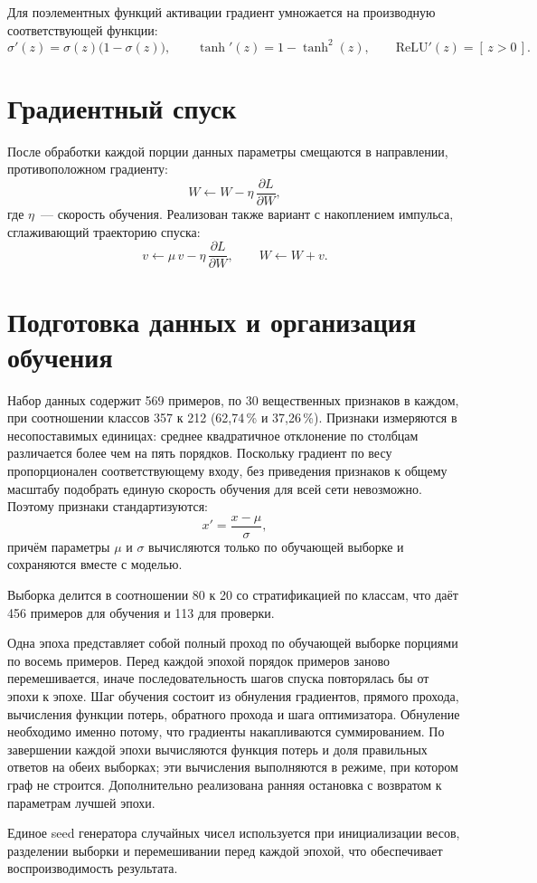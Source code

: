 Для поэлементных функций активации градиент умножается на производную соответствующей
функции:
\begin{equation}
    \sigma'(z) = \sigma(z)\bigl(1 - \sigma(z)\bigr), \qquad
    \tanh'(z) = 1 - \tanh^2(z), \qquad
    \mathrm{ReLU}'(z) = [\,z > 0\,].
    \label{eq:activation-grad}
\end{equation}

\section{Градиентный спуск}

После обработки каждой порции данных параметры смещаются в направлении, противоположном
градиенту:
\begin{equation}
    W \leftarrow W - \eta\,\frac{\partial L}{\partial W},
    \label{eq:sgd}
\end{equation}
где $\eta$~--- скорость обучения. Реализован также вариант с накоплением импульса,
сглаживающий траекторию спуска:
\begin{equation}
    v \leftarrow \mu\,v - \eta\,\frac{\partial L}{\partial W},
    \qquad
    W \leftarrow W + v.
    \label{eq:momentum}
\end{equation}

\section{Подготовка данных и организация обучения}

Набор данных содержит 569 примеров, по 30 вещественных признаков в каждом, при
соотношении классов 357 к 212 (62,74\,\% и 37,26\,\%). Признаки измеряются в
несопоставимых единицах: среднее квадратичное отклонение по столбцам различается более
чем на пять порядков. Поскольку градиент по весу пропорционален соответствующему входу,
без приведения признаков к общему масштабу подобрать единую скорость обучения для всей
сети невозможно. Поэтому признаки стандартизуются:
\begin{equation}
    x' = \frac{x - \mu}{\sigma},
    \label{eq:standardize}
\end{equation}
причём параметры $\mu$ и $\sigma$ вычисляются только по обучающей выборке и сохраняются
вместе с моделью. 

Выборка делится в соотношении 80 к 20 со стратификацией по классам, что даёт 456 примеров
для обучения и 113 для проверки. 

Одна эпоха представляет собой полный проход по обучающей выборке порциями по восемь
примеров. Перед каждой эпохой порядок примеров заново перемешивается, иначе
последовательность шагов спуска повторялась бы от эпохи к эпохе. Шаг обучения состоит из
обнуления градиентов, прямого прохода, вычисления функции потерь, обратного прохода и шага
оптимизатора. Обнуление необходимо именно потому, что градиенты накапливаются
суммированием. По завершении каждой эпохи вычисляются функция потерь и доля правильных
ответов на обеих выборках; эти вычисления выполняются в режиме, при котором граф не
строится. Дополнительно реализована ранняя остановка с возвратом к параметрам лучшей
эпохи.

Единое seed генератора случайных чисел используется при инициализации весов, разделении
выборки и перемешивании перед каждой эпохой, что обеспечивает воспроизводимость
результата. 
